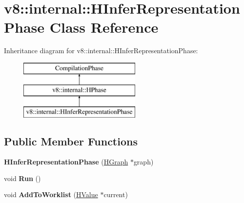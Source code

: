 \hypertarget{classv8_1_1internal_1_1_h_infer_representation_phase}{}\section{v8\+:\+:internal\+:\+:H\+Infer\+Representation\+Phase Class Reference}
\label{classv8_1_1internal_1_1_h_infer_representation_phase}
Inheritance diagram for v8\+:\+:internal\+:\+:H\+Infer\+Representation\+Phase\+:\begin{figure}[H]
\begin{center}
\leavevmode
\includegraphics[height=3.000000cm]{classv8_1_1internal_1_1_h_infer_representation_phase}
\end{center}
\end{figure}
\subsection*{Public Member Functions}
\begin{DoxyCompactItemize}
\item 
{\bfseries H\+Infer\+Representation\+Phase} (\hyperlink{classv8_1_1internal_1_1_h_graph}{H\+Graph} $\ast$graph)\hypertarget{classv8_1_1internal_1_1_h_infer_representation_phase_aeec58f517b7a54f65868d7a60be43746}{}\label{classv8_1_1internal_1_1_h_infer_representation_phase_aeec58f517b7a54f65868d7a60be43746}

\item 
void {\bfseries Run} ()\hypertarget{classv8_1_1internal_1_1_h_infer_representation_phase_a1685ed296ddec7bce7082ced23403d02}{}\label{classv8_1_1internal_1_1_h_infer_representation_phase_a1685ed296ddec7bce7082ced23403d02}

\item 
void {\bfseries Add\+To\+Worklist} (\hyperlink{classv8_1_1internal_1_1_h_value}{H\+Value} $\ast$current)\hypertarget{classv8_1_1internal_1_1_h_infer_representation_phase_ad4a6a6199782065574ee1cfb6988d12b}{}\label{classv8_1_1internal_1_1_h_infer_representation_phase_ad4a6a6199782065574ee1cfb6988d12b}

\end{DoxyCompactItemize}
